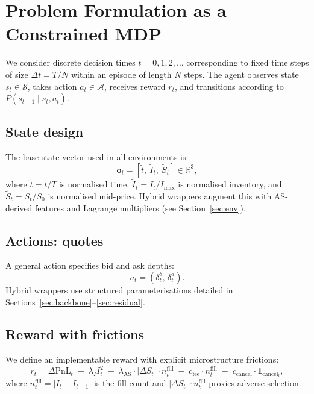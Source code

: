 \documentclass[11pt]{article}
\newcommand{\PnL}{\mathrm{PnL}}
\begin{document}
\section{Problem Formulation as a Constrained MDP}
\label{sec:cmdp}

We consider discrete decision times $t = 0, 1, 2, \ldots$ corresponding
to fixed time steps of size $\Delta t = T/N$ within an episode of length
$N$ steps.
The agent observes state $s_t \in \mathcal{S}$, takes action
$a_t \in \mathcal{A}$, receives reward $r_t$, and transitions according
to $P(s_{t+1} \mid s_t, a_t)$.

\subsection{State design}

The base state vector used in all environments is:
\begin{equation}
  \mathbf{o}_t = \left[\tilde{t},\ \tilde{I}_t,\ \tilde{S}_t\right]
    \in \mathbb{R}^3,
\end{equation}
where $\tilde{t} = t/T$ is normalised time, $\tilde{I}_t = I_t/I_{\max}$
is normalised inventory, and $\tilde{S}_t = S_t / S_0$ is normalised
mid-price.
Hybrid wrappers augment this with AS-derived features and Lagrange
multipliers (see Section~\ref{sec:env}).

\subsection{Actions: quotes}

A general action specifies bid and ask depths:
\begin{equation}
  a_t = \left(\delta_t^b,\, \delta_t^a\right).
\end{equation}
Hybrid wrappers use structured parameterisations detailed in
Sections~\ref{sec:backbone}--\ref{sec:residual}.

\subsection{Reward with frictions}

We define an implementable reward with explicit microstructure frictions:
\begin{equation}
  r_t = \Delta\PnL_t
    \;-\; \lambda_I I_t^2
    \;-\; \lambda_{\text{AS}} \cdot |\Delta S_t| \cdot n^{\text{fill}}_t
    \;-\; c_{\text{fee}} \cdot n^{\text{fill}}_t
    \;-\; c_{\text{cancel}} \cdot \mathbf{1}_{\text{cancel}_t},
  \label{eq:reward_full}
\end{equation}
where $n^{\text{fill}}_t = |I_t - I_{t-1}|$ is the fill count and
$|\Delta S_t| \cdot n^{\text{fill}}_t$ proxies adverse selection.
\end{document}
